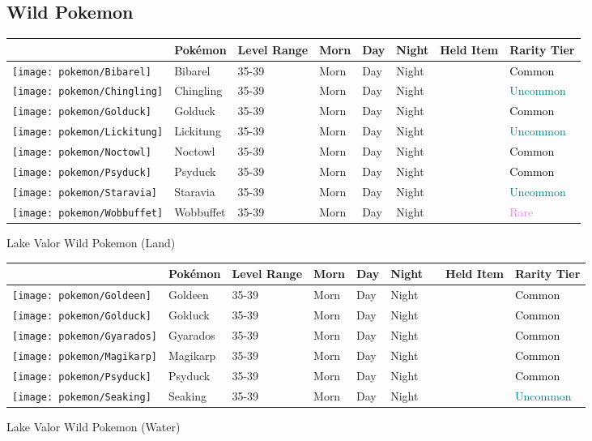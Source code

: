 \subsection{Wild Pokemon}%
\label{subsec:WildPokemon}%
\begin{longtable}{||l l l l l l l l||}%
\hline%
&Pokémon&Level Range&Morn&Day&Night&Held Item&Rarity Tier\\%
\hline%
\endhead%
\hline%
\texttt{[image: pokemon/Bibarel]}&Bibarel&35{-}39&Morn&Day&Night&&\textcolor{black}{%
Common%
}\\%
\hline%
\texttt{[image: pokemon/Chingling]}&Chingling&35{-}39&Morn&Day&Night&&\textcolor{teal}{%
Uncommon%
}\\%
\hline%
\texttt{[image: pokemon/Golduck]}&Golduck&35{-}39&Morn&Day&Night&&\textcolor{black}{%
Common%
}\\%
\hline%
\texttt{[image: pokemon/Lickitung]}&Lickitung&35{-}39&Morn&Day&Night&&\textcolor{teal}{%
Uncommon%
}\\%
\hline%
\texttt{[image: pokemon/Noctowl]}&Noctowl&35{-}39&Morn&Day&Night&&\textcolor{black}{%
Common%
}\\%
\hline%
\texttt{[image: pokemon/Psyduck]}&Psyduck&35{-}39&Morn&Day&Night&&\textcolor{black}{%
Common%
}\\%
\hline%
\texttt{[image: pokemon/Staravia]}&Staravia&35{-}39&Morn&Day&Night&&\textcolor{teal}{%
Uncommon%
}\\%
\hline%
\texttt{[image: pokemon/Wobbuffet]}&Wobbuffet&35{-}39&Morn&Day&Night&&\textcolor{violet}{%
Rare%
}\\%
\hline%
\end{longtable}%
\caption{Lake Valor Wild Pokemon (Land)}%
\begin{longtable}{||l l l l l l l l l||}%
\hline%
&Pokémon&Level Range&Morn&Day&Night&&Held Item&Rarity Tier\\%
\hline%
\endhead%
\hline%
\texttt{[image: pokemon/Goldeen]}&Goldeen&35{-}39&Morn&Day&Night&&&\textcolor{black}{%
Common%
}\\%
\hline%
\texttt{[image: pokemon/Golduck]}&Golduck&35{-}39&Morn&Day&Night&&&\textcolor{black}{%
Common%
}\\%
\hline%
\texttt{[image: pokemon/Gyarados]}&Gyarados&35{-}39&Morn&Day&Night&&&\textcolor{black}{%
Common%
}\\%
\hline%
\texttt{[image: pokemon/Magikarp]}&Magikarp&35{-}39&Morn&Day&Night&&&\textcolor{black}{%
Common%
}\\%
\hline%
\texttt{[image: pokemon/Psyduck]}&Psyduck&35{-}39&Morn&Day&Night&&&\textcolor{black}{%
Common%
}\\%
\hline%
\texttt{[image: pokemon/Seaking]}&Seaking&35{-}39&Morn&Day&Night&&&\textcolor{teal}{%
Uncommon%
}\\%
\hline%
\end{longtable}%
\caption{Lake Valor Wild Pokemon (Water)}